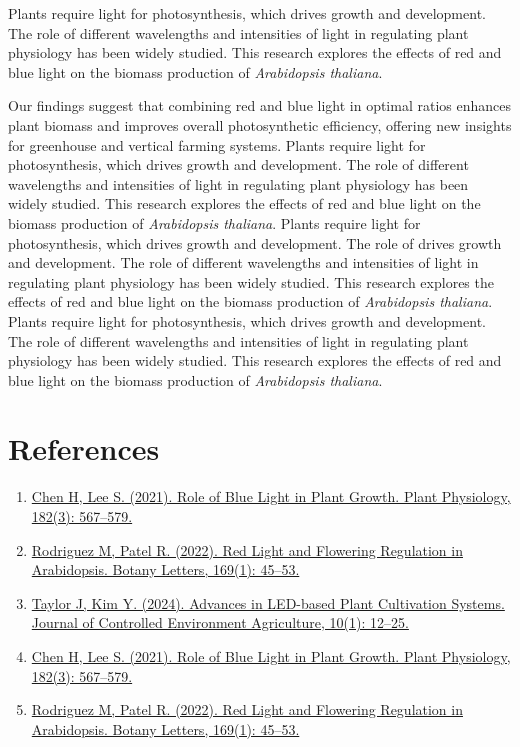 \documentclass[10pt]{article} %
\begin{document}
\begin{multicols}{2}
Plants require light for photosynthesis, which drives growth and development. The role of different wavelengths and intensities of light in regulating plant physiology has been widely studied. This research explores the effects of red and blue light on the biomass production of \textit{Arabidopsis thaliana}.

Our findings suggest that combining red and blue light in optimal ratios enhances plant biomass and improves overall photosynthetic efficiency, offering new insights for greenhouse and vertical farming systems.
Plants require light for photosynthesis, which drives growth and development. The role of different wavelengths and intensities of light in regulating plant physiology has been widely studied. This research explores the effects of red and blue light on the biomass production of \textit{Arabidopsis thaliana}.
Plants require light for photosynthesis, which drives growth and development. The role of drives growth and development. The role of different wavelengths and intensities of light in regulating plant physiology has been widely studied. This research explores the effects of red and blue light on the biomass production of \textit{Arabidopsis thaliana}.
Plants require light for photosynthesis, which drives growth and development. The role of different wavelengths and intensities of light in regulating plant physiology has been widely studied. This research explores the effects of red and blue light on the biomass production of \textit{Arabidopsis thaliana}.

\section*{References}
\fontsize{8}{9.6}\selectfont
\begin{enumerate}
    \item \href{https://doi.org/10.1093/plphys/kiab123}{Chen H, Lee S. (2021). Role of Blue Light in Plant Growth. Plant Physiology, 182(3): 567–579.}
    \item \href{https://doi.org/10.1080/23818107.2022.1690001}{Rodriguez M, Patel R. (2022). Red Light and Flowering Regulation in Arabidopsis. Botany Letters, 169(1): 45–53.}
    \item \href{https://doi.org/10.1016/j.jcea.2024.01.005}{Taylor J, Kim Y. (2024). Advances in LED-based Plant Cultivation Systems. Journal of Controlled Environment Agriculture, 10(1): 12–25.}

    \item \href{https://doi.org/10.1093/plphys/kiab123}{Chen H, Lee S. (2021). Role of Blue Light in Plant Growth. Plant Physiology, 182(3): 567–579.}
    \item \href{https://doi.org/10.1080/23818107.2022.1690001}{Rodriguez M, Patel R. (2022). Red Light and Flowering Regulation in Arabidopsis. Botany Letters, 169(1): 45–53.}
\end{enumerate}

\end{multicols}

\label{TotPages}
\end{document}
